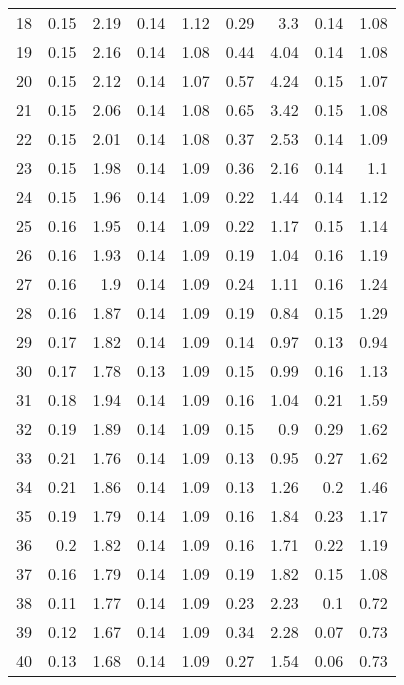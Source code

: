 \begin{table}[h]
\begin{tabular}{crrrrrrrr}
		18&0.15&2.19&0.14&1.12&0.29&3.3&0.14&1.08\\
		19&0.15&2.16&0.14&1.08&0.44&4.04&0.14&1.08\\
		20&0.15&2.12&0.14&1.07&0.57&4.24&0.15&1.07\\
		21&0.15&2.06&0.14&1.08&0.65&3.42&0.15&1.08\\
		22&0.15&2.01&0.14&1.08&0.37&2.53&0.14&1.09\\
		23&0.15&1.98&0.14&1.09&0.36&2.16&0.14&1.1\\
		24&0.15&1.96&0.14&1.09&0.22&1.44&0.14&1.12\\
		25&0.16&1.95&0.14&1.09&0.22&1.17&0.15&1.14\\
		26&0.16&1.93&0.14&1.09&0.19&1.04&0.16&1.19\\
		27&0.16&1.9&0.14&1.09&0.24&1.11&0.16&1.24\\
		28&0.16&1.87&0.14&1.09&0.19&0.84&0.15&1.29\\
		29&0.17&1.82&0.14&1.09&0.14&0.97&0.13&0.94\\
		30&0.17&1.78&0.13&1.09&0.15&0.99&0.16&1.13\\
		31&0.18&1.94&0.14&1.09&0.16&1.04&0.21&1.59\\
		32&0.19&1.89&0.14&1.09&0.15&0.9&0.29&1.62\\
		33&0.21&1.76&0.14&1.09&0.13&0.95&0.27&1.62\\
		34&0.21&1.86&0.14&1.09&0.13&1.26&0.2&1.46\\
		35&0.19&1.79&0.14&1.09&0.16&1.84&0.23&1.17\\
		36&0.2&1.82&0.14&1.09&0.16&1.71&0.22&1.19\\
		37&0.16&1.79&0.14&1.09&0.19&1.82&0.15&1.08\\
		38&0.11&1.77&0.14&1.09&0.23&2.23&0.1&0.72\\
		39&0.12&1.67&0.14&1.09&0.34&2.28&0.07&0.73\\
		40&0.13&1.68&0.14&1.09&0.27&1.54&0.06&0.73\\
		\bottomrule
	\end{tabular}
	\label{table:completeMomentError}
\end{table}